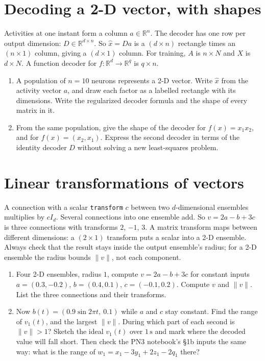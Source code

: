 \documentclass[11pt,letterpaper]{article}
\begin{document}
\section{Decoding a 2-D vector, with shapes}

\begin{idea}
Activities at one instant form a column $a \in \mathbb{R}^n$. The decoder has one row per output dimension: $D \in \mathbb{R}^{d \times n}$. So $\hat x = Da$ is a $(d \times n)$ rectangle times an $(n \times 1)$ column, giving a $(d \times 1)$ column. For training, $A$ is $n \times N$ and $X$ is $d \times N$. A function decoder for $f : \mathbb{R}^d \to \mathbb{R}^q$ is $q \times n$.
\end{idea}

\begin{enumerate}
\item A population of $n = 10$ neurons represents a 2-D vector. Write $\hat x$ from the activity vector $a$, and draw each factor as a labelled rectangle with its dimensions. Write the regularized decoder formula and the shape of every matrix in it.
\item From the same population, give the shape of the decoder for $f(x) = x_1 x_2$, and for $f(x) = (x_2, x_1)$. Express the second decoder in terms of the identity decoder $D$ without solving a new least-squares problem.
\end{enumerate}

\section{Linear transformations of vectors}

\begin{idea}
A connection with a scalar \texttt{transform} $c$ between two $d$-dimensional ensembles multiplies by $cI_d$. Several connections into one ensemble add. So $v = 2a - b + 3c$ is three connections with transforms $2$, $-1$, $3$. A matrix transform maps between different dimensions: a $(2 \times 1)$ transform puts a scalar into a 2-D ensemble. Always check that the result stays inside the output ensemble's radius; for a 2-D ensemble the radius bounds $\|v\|$, not each component.
\end{idea}

\begin{enumerate}
\item Four 2-D ensembles, radius $1$, compute $v = 2a - b + 3c$ for constant inputs $a = (0.3, -0.2)$, $b = (0.4, 0.1)$, $c = (-0.1, 0.2)$. Compute $v$ and $\|v\|$. List the three connections and their transforms.
\item Now $b(t) = (0.9\sin 2\pi t,\ 0.1)$ while $a$ and $c$ stay constant. Find the range of $v_1(t)$, and the largest $\|v\|$. During which part of each second is $\|v\| > 1$? Sketch the ideal $v_1(t)$ over $1\,\mathrm{s}$ and mark where the decoded value will fall short. Then check the PN3 notebook's \S1b inputs the same way: what is the range of $w_1 = x_1 - 3y_1 + 2z_1 - 2q_1$ there?
\end{enumerate}
\end{document}
